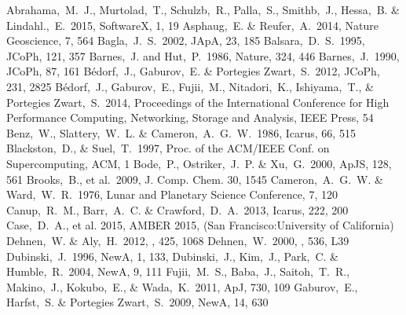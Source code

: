 \documentclass[proof]{pasj01}
\newcommand{\icarus}{Icarus}
\begin{document}
\begin{thebibliography}{}
Abrahama,~M.~J., Murtolad,~T., Schulzb,~R., Palla,~S., Smithb,~J., Hessa,~B. \& Lindahl.,~E.\ 2015, SoftwareX, 1, 19
{{Asphaug},~E. \& {Reufer},~A.}\ 2014, Nature Geoscience, 7, 564
{Bagla},~J.~S.\ 2002, JApA, 23, 185
{Balsara},~D.~S.\ 1995, JCoPh, 121, 357
{Barnes},~J. and {Hut},~P.\ 1986, Nature, 324, 446
{Barnes},~J.\ 1990, JCoPh, 87, 161
{B{\'e}dorf},~J., {Gaburov},~E. \& {Portegies Zwart},~S.\ 2012, JCoPh, 231, 2825
B{\'e}dorf,~J., Gaburov,~E., Fujii,~M., Nitadori,~K., Ishiyama,~T., \& Portegies Zwart,~S.\ 2014, Proceedings of the International Conference for High Performance Computing, Networking, Storage and Analysis, IEEE Press, 54
{{Benz},~W., {Slattery},~W.~L. \& {Cameron},~A.~G.~W.}\ 1986, \icarus, 66, 515
Blackston,~D., \& Suel,~T.\ 1997, Proc. of the ACM/IEEE Conf. on Supercomputing, ACM, 1
{Bode},~P., {Ostriker},~J.~P. \& {Xu},~G.\ 2000, ApJS, 128, 561
Brooks,~B., et al.\ 2009, J. Comp. Chem. 30, 1545
{{Cameron},~A.~G.~W. \& {Ward},~W.~R.}\ 1976, Lunar and Planetary Science Conference, 7, 120
{{Canup},~R.~M., {Barr},~A.~C. \& {Crawford},~D.~A.}\ 2013, \icarus, 222, 200
Case,~D.~A., et al. 2015, AMBER 2015, (San Francisco:University of California)
{{Dehnen},~W. \& {Aly},~H.}\ 2012, \mnras, 425, 1068
Dehnen,~W.\ 2000, \apjl, 536, L39
{Dubinski},~J.\ 1996, NewA, 1, 133,
Dubinski,~J., Kim,~J., Park,~C. \& Humble,~R.\ 2004, NewA, 9, 111
{Fujii},~M.~S., {Baba},~J., {Saitoh},~T.~R., {Makino},~J., {Kokubo},~E., \& {Wada},~K.\ 2011, ApJ, 730, 109
{Gaburov},~E., {Harfst},~S. \& {Portegies Zwart},~S.\ 2009, NewA, 14, 630

\end{thebibliography}
\end{document}

